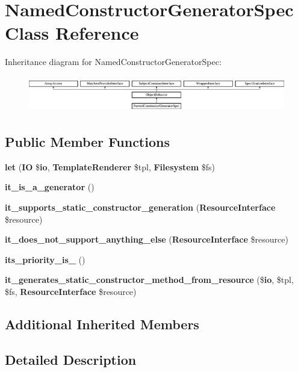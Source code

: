 \section{Named\+Constructor\+Generator\+Spec Class Reference}
\label{classspec_1_1_php_spec_1_1_code_generator_1_1_generator_1_1_named_constructor_generator_spec}
Inheritance diagram for Named\+Constructor\+Generator\+Spec\+:\begin{figure}[H]
\begin{center}
\leavevmode
\includegraphics[height=1.592417cm]{classspec_1_1_php_spec_1_1_code_generator_1_1_generator_1_1_named_constructor_generator_spec}
\end{center}
\end{figure}
\subsection*{Public Member Functions}
\begin{DoxyCompactItemize}
\item 
{\bf let} ({\bf I\+O} \${\bf io}, {\bf Template\+Renderer} \$tpl, {\bf Filesystem} \$fs)
\item 
{\bf it\+\_\+is\+\_\+a\+\_\+generator} ()
\item 
{\bf it\+\_\+supports\+\_\+static\+\_\+constructor\+\_\+generation} ({\bf Resource\+Interface} \$resource)
\item 
{\bf it\+\_\+does\+\_\+not\+\_\+support\+\_\+anything\+\_\+else} ({\bf Resource\+Interface} \$resource)
\item 
{\bf its\+\_\+priority\+\_\+is\+\_} ()
\item 
{\bf it\+\_\+generates\+\_\+static\+\_\+constructor\+\_\+method\+\_\+from\+\_\+resource} (\${\bf io}, \$tpl, \$fs, {\bf Resource\+Interface} \$resource)
\end{DoxyCompactItemize}
\subsection*{Additional Inherited Members}


\subsection{Detailed Description}


